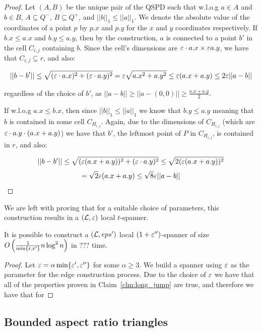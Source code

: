 \documentclass[12pt]{article}%
\begin{document}
\begin{proof}
	Let $(A,B)$ be the unique pair of the QSPD such that w.l.o.g $a\in A$ and $b\in B$, $A\subseteq Q^-$, $B\subseteq Q^+$, and $||b||_{1} \leq ||a||_{1}$. We denote the absolute value of the coordinates of a point $p$ by $p.x$ and $p.y$ for the $x$ and $y$ coordinates respectively. If $b.x \leq a.x$ and $b.y \leq a.y$, then by the construction, $a$ is connected to a point $b'$ in the cell $C_{i,j}$ containing $b$. Since the cell's dimensions are $\varepsilon\cdot a.x \times \varepsilon a.y$, we have that $C_{i,j}\subseteq r$, and also:
	
	$$||b-b'||\leq \sqrt{(\varepsilon\cdot a.x)^2+(\varepsilon\cdot a.y)^2}=\varepsilon\sqrt{a.x^2+a.y^2}\leq \varepsilon(a.x+a.y) \leq 2\varepsilon||a-b||$$
	
	regardless of the choice of $b'$, as $||a-b||\geq||a-(0,0)||\geq \frac{a.x+a.y}{2}$. 
	
	If w.l.o.g $a.x\leq b.x$, then since $||b||_{1} \leq ||a||_{1}$ we know that $b.y \leq a.y$ meaning that $b$ is contained in some cell $C_{H_{i,j}}$. Again, due to the dimensions of $C_{H_{i,j}}$ (which are $\eps\cdot a.y \time \eps\cdot(a.x+a.y)$) we have that $b'$, the leftmost point of $P$ in $C_{H_{i,j}}$, is contained in $r$, and also:
	
	$$||b-b'||\leq \sqrt{(\varepsilon (a.x+a.y))^2+(\varepsilon\cdot a.y)^2}\leq \sqrt{2(\varepsilon (a.x+a.y))^2} $$
	$$=\sqrt{2}\varepsilon(a.x+a.y) \leq \sqrt{8}\varepsilon||a-b||$$
	
\end{proof}

We are left with proving that for a suitable choice of parameters, this construction results in a $(\mathcal{L},\varepsilon)$ local $t$-spanner.


\begin{claim}
	It is possible to construct a $(\mathcal{L}, eps')$ local $(1+\varepsilon'')$-spanner of size $O\left(\frac{1}{\min\{\varepsilon, \varepsilon'\}}n\log^2n\right)$ in ??? time.
\end{claim} 

\begin{proof} 
	Let $\varepsilon = \alpha \min \{\varepsilon',\varepsilon''\}$ for some $\alpha \geq 3$. We build a spanner using $\varepsilon$ as the parameter for the edge construction process. Due to the choice of $\varepsilon$ we have that all of the properties proven in Claim~\ref{clm:long_jump} are true, and therefore we have that for 
\end{proof}


\subsection{Bounded aspect ratio triangles}
\end{document}
